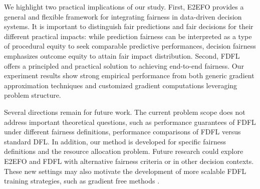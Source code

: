 \documentclass[ijoc,sglanonrev]{informs4}
\begin{document}
We highlight two practical implications of our study. First, E2EFO provides a general and flexible framework for integrating fairness in data-driven decision systems. It is important to distinguish fair predictions and fair decisions for their different practical impacts: while prediction fairness can be interpreted as a type of procedural equity to seek comparable predictive performances, decision fairness emphasizes outcome equity to attain fair impact distribution. Second, FDFL offers a principled and practical solution to achieving end-to-end fairness. Our experiment results show strong empirical performance from both generic gradient approximation techniques and customized gradient computations leveraging problem structure. 

Several directions remain for future work. The current problem scope does not address important theoretical questions, such as 
performance guarantees of FDFL under different fairness definitions, performance comparisons of FDFL versus standard DFL. 
In addition, our method is developed for specific fairness definitions and the resource allocation problem. Future research could explore E2EFO and FDFL with alternative fairness 
criteria or in other decision contexts. These new settings may also motivate the development of more scalable FDFL training strategies, such as gradient free methods \citep{shah2022decision,zharmagambetov2023landscape}.


\end{document}
